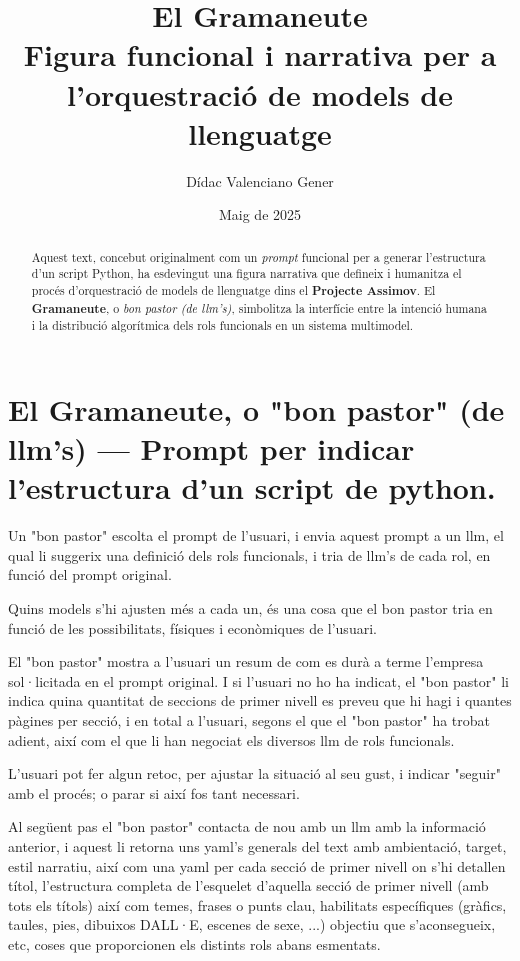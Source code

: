 \documentclass[12pt]{article}
\title{El Gramaneute\\\large Figura funcional i narrativa per a l’orquestració de models de llenguatge}
\author{Dídac Valenciano Gener}
\date{Maig de 2025}
\begin{document}
	
	\maketitle
	
	\begin{abstract}
	\noindent	Aquest text, concebut originalment com un \textit{prompt} funcional per a generar l’estructura d’un script Python, ha esdevingut una figura narrativa que defineix i humanitza el procés d’orquestració de models de llenguatge dins el \textbf{Projecte Assimov}. El \textbf{Gramaneute}, o \textit{bon pastor (de llm's)}, simbolitza la interfície entre la intenció humana i la distribució algorítmica dels rols funcionals en un sistema multimodel.
	\end{abstract}

\section*{El Gramaneute, o "bon pastor" (de llm's) — Prompt per indicar l'estructura d'un script de python.}
	
	Un "bon pastor" escolta el prompt de l'usuari, i envia aquest prompt a un llm, el qual li suggerix una definició dels rols funcionals, i tria de llm's de cada rol, en funció del prompt original.
	
	Quins models s'hi ajusten més a cada un, és una cosa que el bon pastor tria en funció de les possibilitats, físiques i econòmiques de l'usuari.
	
	El "bon pastor" mostra a l'usuari un resum de com es durà a terme l'empresa sol·licitada en el prompt original. I si l'usuari no ho ha indicat, el "bon pastor" li indica quina quantitat de seccions de primer nivell es preveu que hi hagi i quantes pàgines per secció, i en total a l'usuari, segons el que el "bon pastor" ha trobat adient, així com el que li han negociat els diversos llm de rols funcionals.
	
	L'usuari pot fer algun retoc, per ajustar la situació al seu gust, i indicar "seguir" amb el procés; o parar si així fos tant necessari.\\
	
	\medskip
	
	Al següent pas el "bon pastor" contacta de nou amb un llm amb la informació anterior, i aquest li retorna uns yaml's generals del text amb ambientació, target, estil narratiu, així com una yaml per cada secció de primer nivell on s'hi detallen títol, l'estructura completa de l'esquelet d'aquella secció de primer nivell (amb tots els títols) així com temes, frases o punts clau, habilitats específiques (gràfics, taules, pies, dibuixos DALL·E, escenes de sexe, ...) objectiu que s'aconsegueix, etc, coses que proporcionen els distints rols abans esmentats.
	
\end{document}

